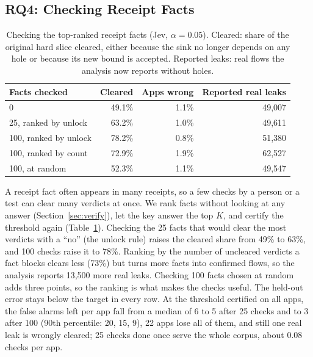 
\subsection{RQ4: Checking Receipt Facts}
\label{sec:rq4}

\begin{table}[t]
\caption{Checking the top-ranked receipt facts (Jev, $\alpha=0.05$). Cleared: share of the original hard slice cleared, either because the sink no longer depends on any hole or because its new bound is accepted. Reported leaks: real flows the analysis now reports without holes.}
\label{tab:verify}
\small
\begin{tabular}{@{}lrrr@{}}
\toprule
Facts checked & Cleared & Apps wrong & Reported real leaks\\
\midrule
0 & 49.1\% & 1.1\% & 49{,}007\\
25, ranked by unlock & 63.2\% & 1.0\% & 49{,}611\\
100, ranked by unlock & 78.2\% & 0.8\% & 51{,}380\\
100, ranked by count & 72.9\% & 1.9\% & 62{,}527\\
100, at random & 52.3\% & 1.1\% & 49{,}547\\
\bottomrule
\end{tabular}
\end{table}

A receipt fact often appears in many receipts, so a few checks by a person or a test can clear many verdicts at once.
We rank facts without looking at any answer (Section~\ref{sec:verify}), let the key answer the top $K$, and certify the threshold again (Table~\ref{tab:verify}).
Checking the 25 facts that would clear the most verdicts with a ``no'' (the unlock rule) raises the cleared share from 49\% to 63\%, and 100 checks raise it to 78\%.
Ranking by the number of uncleared verdicts a fact blocks clears less (73\%) but turns more facts into confirmed flows, so the analysis reports 13{,}500 more real leaks.
Checking 100 facts chosen at random adds three points, so the ranking is what makes the checks useful.
The held-out error stays below the target in every row.
At the threshold certified on all apps, the false alarms left per app fall from a median of 6 to 5 after 25 checks and to 3 after 100 (90th percentile: 20, 15, 9), 22 apps lose all of them, and still one real leak is wrongly cleared; 25 checks done once serve the whole corpus, about 0.08 checks per app.


